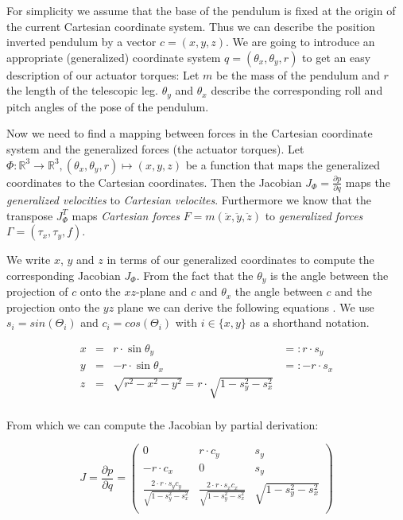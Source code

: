 \documentclass[english,ngerman]{KITreprt}
\begin{document}
For simplicity we assume that the base of the pendulum is fixed at the
origin of the current Cartesian coordinate system. Thus we can describe
the position inverted pendulum by a vector $c = (x, y, z)$. We are going
to introduce an appropriate (generalized) coordinate system
$q = (\theta_x, \theta_y, r)$ to get an easy description of our actuator
torques: Let $m$ be the mass of the pendulum and $r$ the length of the
telescopic leg. $\theta_y$ and $\theta_x$ describe the corresponding
roll and pitch angles of the pose of the pendulum.

Now we need to find a mapping between forces in the Cartesian coordinate
system and the generalized forces (the actuator torques). Let
$\Phi: \mathbb{R}^3 \longrightarrow \mathbb{R}^3, (\theta_x, \theta_y, r) \mapsto (x, y, z)$
be a function that maps the generalized coordinates to the Cartesian
coordinates. Then the Jacobian $J_\Phi = \frac{\partial p}{\partial q}$
maps the \emph{generalized velocities} to \emph{Cartesian velocites}.
Furthermore we know that the transpose $J_\Phi^T$ maps \emph{Cartesian
forces} $F = m (\ddot x, \ddot y, \ddot z)$ to \emph{generalized forces}
$\Gamma = (\tau_x, \tau_y, f)$.

We write $x$, $y$ and $z$ in terms of our generalized coordinates to
compute the corresponding Jacobian $J_\Phi$. From the fact that the
$\theta_y$ is the angle between the projection of $c$ onto the
$xz$-plane and $c$ and $\theta_x$ the angle between $c$ and the
projection onto the $yz$ plane we can derive the following equations
\cite{kajita20013d}. We use $s_i = sin(\Theta_i)$ and
$c_i = cos(\Theta_i)$ with $i \in \{x, y\}$ as a shorthand notation.

\begin{equation}
\begin{array}{lcll} \label{eq:lip-xyz}
x & = & r \cdot \sin \theta_y & =: r \cdot s_y\\
y & = & -r \cdot \sin \theta_x & =: -r \cdot s_x \\
z & = & \sqrt{r^2 - x^2 - y^2} = r \cdot \sqrt{1 - s_y^2 - s_x^2} & \\
\end{array}
\end{equation}

From which we can compute the Jacobian by partial derivation:

\begin{equation} \label{eq:lip-Jacobian}
J = \frac{\partial p}{\partial q} = \left( \begin{array}{rcl}
0 & r \cdot c_y & s_y \\
-r \cdot c_x & 0 & s_y \\
\frac{2 \cdot r \cdot s_y c_y}{\sqrt{1 - s_y^2 - s_x^2}} & \frac{2 \cdot r \cdot s_x c_x}{\sqrt{1 - s_y^2 - s_x^2}} & \sqrt{1 - s_y^2 - s_x^2}\\
\end{array}
\right)
\end{equation}
\end{document}
